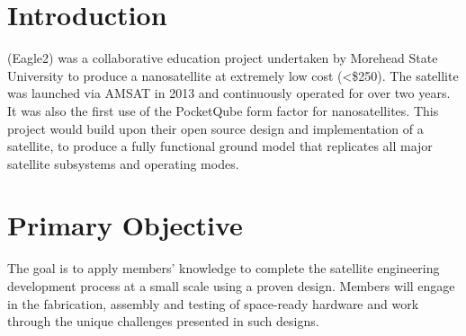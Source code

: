 \documentclass[conference]{IEEEtran} %
\begin{document}

\section{Introduction}
\label{sec:introduction}

 (Eagle2) was a collaborative education project undertaken by Morehead State University to produce a nanosatellite at extremely low cost (<\$250).
The satellite was launched via AMSAT in 2013 and continuously operated for over two years.
It was also the first use of the PocketQube form factor for nanosatellites.
This project would build upon their open source design and implementation of a satellite, to produce a fully functional ground model that replicates all major satellite subsystems and operating modes.


\section{Primary Objective}
\label{sec:primary-obj}

The goal is to apply members' knowledge to complete the satellite engineering development process at a small scale using a proven design.
Members will engage in the fabrication, assembly and testing of space-ready hardware and work through the unique challenges presented in such designs.

\end{document}
